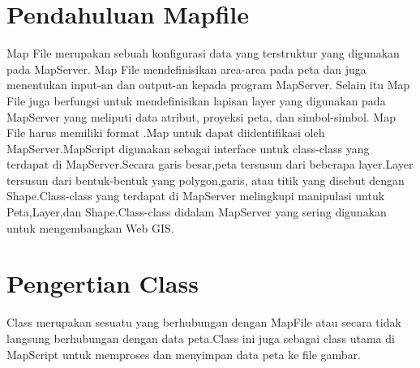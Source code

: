 


\section{Pendahuluan Mapfile}
    Map  File  merupakan  sebuah  konfigurasi  data  yang terstruktur  yang  digunakan  pada  MapServer.  Map  File mendefinisikan  area-area  pada  peta  dan  juga  menentukan input-an dan output-an kepada program MapServer. Selain itu Map File juga berfungsi untuk mendefinisikan lapisan layer yang digunakan pada MapServer yang meliputi data atribut, proyeksi peta, dan simbol-simbol. Map File harus memiliki format .Map untuk dapat diidentifikasi oleh MapServer.MapScript digunakan sebagai interface untuk class-class yang terdapat di MapServer.Secara garis besar,peta tersusun dari beberapa layer.Layer tersusun dari bentuk-bentuk yang polygon,garis, atau titik yang disebut dengan Shape.Class-class yang terdapat di MapServer melingkupi manipulasi untuk Peta,Layer,dan Shape.Class-class didalam MapServer yang sering digunakan untuk mengembangkan Web GIS.

\section{Pengertian Class}
    Class merupakan sesuatu yang berhubungan dengan MapFile atau secara tidak langsung berhubungan dengan data peta.Class ini juga sebagai class utama di MapScript untuk memproses dan menyimpan data peta ke file gambar.
    
